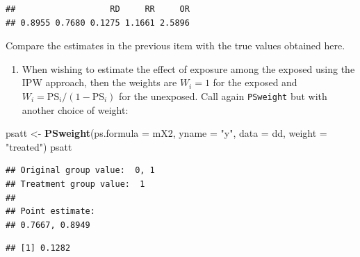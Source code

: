 \documentclass[
]{book}
\newenvironment{Shaded}{\begin{snugshade}}{\end{snugshade}}
\newcommand{\AttributeTok}[1]{\textcolor[rgb]{0.13,0.29,0.53}{#1}}
\newcommand{\DecValTok}[1]{\textcolor[rgb]{0.00,0.00,0.81}{#1}}
\newcommand{\FunctionTok}[1]{\textcolor[rgb]{0.13,0.29,0.53}{\textbf{#1}}}
\newcommand{\NormalTok}[1]{#1}
\newcommand{\OtherTok}[1]{\textcolor[rgb]{0.56,0.35,0.01}{#1}}
\newcommand{\SpecialCharTok}[1]{\textcolor[rgb]{0.81,0.36,0.00}{\textbf{#1}}}
\newcommand{\StringTok}[1]{\textcolor[rgb]{0.31,0.60,0.02}{#1}}
\providecommand{\tightlist}{%
  \setlength{\itemsep}{0pt}\setlength{\parskip}{0pt}}
\begin{document}
\begin{verbatim}
##                   RD     RR     OR 
## 0.8955 0.7680 0.1275 1.1661 2.5896
\end{verbatim}

Compare the estimates in the previous item with the
true values obtained here.

\begin{enumerate}
\def\labelenumi{\arabic{enumi}.}
\setcounter{enumi}{3}
\tightlist
\item
  When wishing to estimate
  the effect of exposure among the exposed using the IPW
  approach, then the weights are \(W_i = 1\) for the exposed and
  \(W_i = \text{PS}_i/(1-\text{PS}_i)\) for the unexposed.
  Call again \texttt{PSweight} but with another choice of weight:
\end{enumerate}

\begin{Shaded}
\begin{Highlighting}[]
\NormalTok{psatt }\OtherTok{\textless{}{-}} \FunctionTok{PSweight}\NormalTok{(}\AttributeTok{ps.formula =}\NormalTok{ mX2, }\AttributeTok{yname =} \StringTok{"y"}\NormalTok{, }\AttributeTok{data =}\NormalTok{ dd, }\AttributeTok{weight =} \StringTok{"treated"}\NormalTok{)}
\NormalTok{psatt}
\end{Highlighting}
\end{Shaded}

\begin{verbatim}
## Original group value:  0, 1 
## Treatment group value:  1 
## 
## Point estimate: 
## 0.7667, 0.8949
\end{verbatim}

\begin{Shaded}
\end{Shaded}

\begin{verbatim}
## [1] 0.1282
\end{verbatim}

\begin{Shaded}
\end{Shaded}
\end{document}
